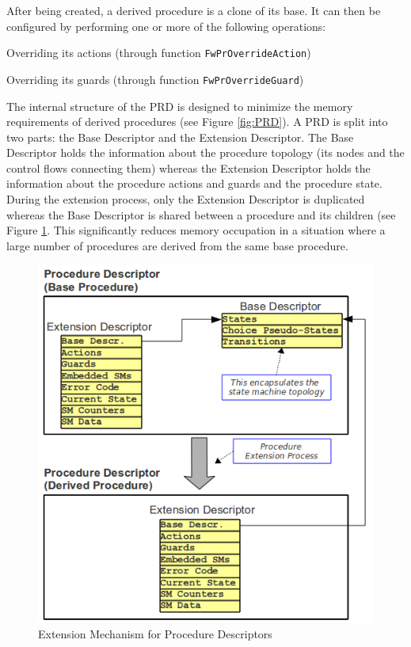\documentclass[a4paper,10pt]{article}
\newenvironment{fw_itemize}						%
{\begin{itemize}
  \setlength{\itemsep}{1mm}
  \setlength{\parskip}{0pt}
  \setlength{\parsep}{0pt}}
{\end{itemize}}
\begin{document}
After being created, a derived procedure is a clone of its base. It can then be configured by performing 
one or more of the following operations: 

\begin{fw_itemize}
\item Overriding its actions (through function \texttt{FwPrOverrideAction})
\item Overriding its guards (through function \texttt{FwPrOverrideGuard}) 
\end{fw_itemize}

The internal structure of the PRD is designed to minimize the memory requirements of derived procedures
(see Figure \ref{fig:PRD}). A PRD is split into two parts: the Base Descriptor and the Extension 
Descriptor. The Base Descriptor holds the information about the procedure topology (its nodes and the control
flows connecting them) whereas the Extension Descriptor holds the information about the procedure 
actions and guards and the procedure state. During the extension process, only the Extension 
Descriptor is duplicated whereas the Base Descriptor is shared between a procedure and its children 
(see Figure \ref{fig:PRDExtension}. This significantly reduces memory occupation in a situation where a 
large number of procedures are derived from the same base procedure. 



\begin{figure}[ht]
 \centering
 \includegraphics[scale=0.52,keepaspectratio=true]{../images/PRDExtension.png}
 \caption{Extension Mechanism for Procedure Descriptors}
 \label{fig:PRDExtension}
\end{figure}
\end{document}
